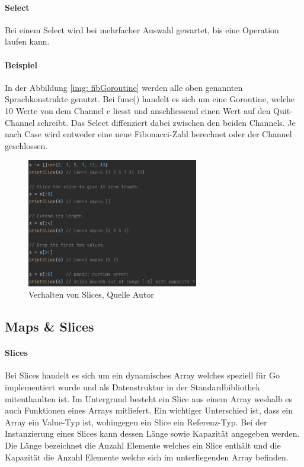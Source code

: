 \documentclass[12pt,titlepage]{article}
\begin{document}
\paragraph{Select}
Bei einem Select wird bei mehrfacher Auswahl gewartet, bis eine Operation laufen kann. 

\paragraph{Beispiel}
In der Abbildung \ref{img: fibGoroutine} werden alle oben genannten Sprachkonstrukte genutzt. Bei func() handelt es sich um eine Goroutine, welche 10 Werte von dem Channel c liesst und anschliessend einen Wert auf den Quit-Channel schreibt. Das Select diffenziert dabei zwischen den beiden Channels. Je nach Case wird entweder eine neue Fibonacci-Zahl berechnet oder der Channel geschlossen.

\begin{figure}
	\centering
	\includegraphics[width=7.5cm]{slices}
	\caption{Verhalten von Slices, Quelle Autor}\label{slices}
\end{figure}
\subsection{Maps \& Slices}
\paragraph{Slices}
Bei Slices handelt es sich um ein dynamisches Array welches speziell für Go implementiert wurde und als Datenstruktur in der Standardbibliothek mitenthanlten ist.
Im Untergrund besteht ein Slice aus einem Array weshalb es auch Funktionen eines Arrays mitliefert.
Ein wichtiger Unterschied ist, dass ein Array ein Value-Typ ist, wohingegen ein Slice ein Referenz-Typ.
Bei der Instanzierung eines Slices kann dessen Länge sowie Kapazität angegeben werden.
Die Länge bezeichnet die Anzahl Elemente welches ein Slice enthält und die Kapazität die Anzahl Elemente welche sich im unterliegenden Array befinden.
\end{document}
